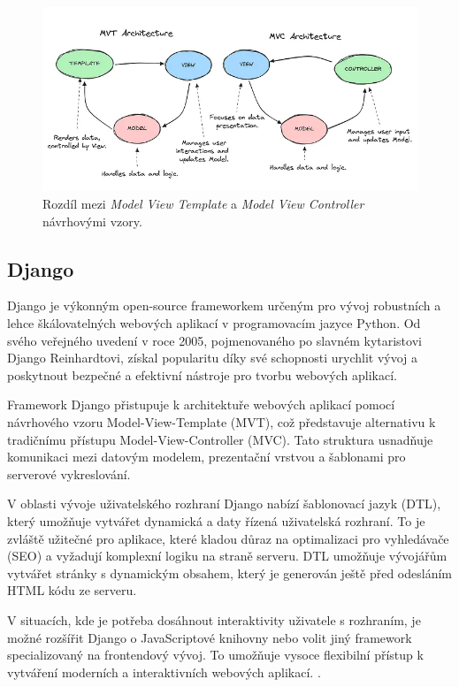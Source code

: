 \begin{figure}[H]
    \centering
    \includegraphics[width=1.0\textwidth]{figures/mvc_mvt_difference}
    \caption{Rozdíl mezi \textit{Model View Template} a \textit{Model View Controller} návrhovými vzory. \cite{mvc_mvt_difference_img}}
    \label{fig:mvc_mvt_difference}
\end{figure}

\subsection{Django}
\label{subsec:dev-framework-django}
Django je výkonným open-source frameworkem určeným pro vývoj robustních a lehce škálovatelných webových aplikací v programovacím jazyce Python. Od svého veřejného uvedení v roce 2005, pojmenovaného po slavném kytaristovi Django Reinhardtovi, získal popularitu díky své schopnosti urychlit vývoj a poskytnout bezpečné a efektivní nástroje pro tvorbu webových aplikací.

Framework Django přistupuje k architektuře webových aplikací pomocí návrhového vzoru Model-View-Template (MVT), což představuje alternativu k tradičnímu přístupu Model-View-Controller (MVC). Tato struktura usnadňuje komunikaci mezi datovým modelem, prezentační vrstvou a šablonami pro serverové vykreslování.

V oblasti vývoje uživatelského rozhraní Django nabízí šablonovací jazyk (DTL), který umožňuje vytvářet dynamická a daty řízená uživatelská rozhraní. To je zvláště užitečné pro aplikace, které kladou důraz na optimalizaci pro vyhledávače (SEO) a vyžadují komplexní logiku na straně serveru. DTL umožňuje vývojářům vytvářet stránky s dynamickým obsahem, který je generován ještě před odesláním HTML kódu ze serveru.

V situacích, kde je potřeba dosáhnout interaktivity uživatele s rozhraním, je možné rozšířit Django o JavaScriptové knihovny nebo volit jiný framework specializovaný na frontendový vývoj. To umožňuje vysoce flexibilní přístup k vytváření moderních a interaktivních webových aplikací. \cite{about_django}.

